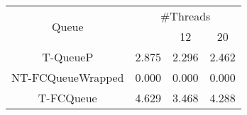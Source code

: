 \begin{tabular}{|c|c|c|c|}
\hline
\multirow{2}{*}{Queue} & \multicolumn{3}{c|}{\#Threads}\\\cline{2-4}& \quad 4 & 12 & 20\\
\hline
\hline
T-QueueP & 2.875 & 2.296 & 2.462\\
NT-FCQueueWrapped & 0.000 & 0.000 & 0.000\\
T-FCQueue & 4.629 & 3.468 & 4.288\\
\hline\end{tabular}
